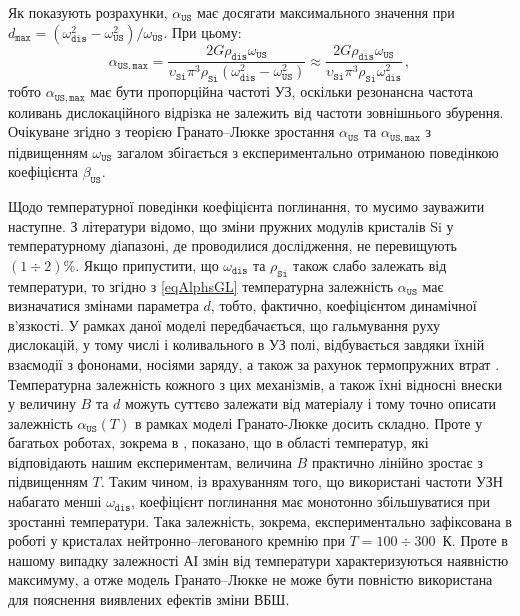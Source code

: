 Як показують розрахунки, $\alpha_\mathtt{US}$ має досягати максимального значення при
$d_\mathtt{max}=(\omega_\mathtt{dis}^2 - \omega_\mathtt{US}^2)/\omega_\mathtt{US}$.
При цьому:
\begin{equation}
\label{eqAlGLmax}
\alpha_\mathtt{US,max}=\frac{2G\rho_\mathtt{dis}\omega_\mathtt{US}}{\upsilon_\mathtt{Si}\pi^3\rho_\mathtt{Si}(\omega_\mathtt{dis}^2-\omega_\mathtt{US}^2)}
\approx\frac{2G\rho_\mathtt{dis}\omega_\mathtt{US}}{\upsilon_\mathtt{Si}\pi^3\rho_\mathtt{Si}\omega_\mathtt{dis}^2}\,,
\end{equation}
тобто $\alpha_\mathtt{US,max}$ має бути пропорційна частоті УЗ,
оскільки резонансна частота коливань дислокаційного відрізка не залежить від частоти зовнішнього збурення.
Очікуване згідно з теорією Гранато--Люкке зростання $\alpha_\mathtt{US}$ та $\alpha_\mathtt{US,max}$ з підвищенням $\omega_\mathtt{US}$ загалом
збігається з експериментально отриманою поведінкою коефіцієнта $\beta_\mathtt{US}$.

Щодо температурної поведінки коефіцієнта поглинання, то мусимо зауважити наступне.
З літератури \cite{Si_C:Temp} відомо, що зміни пружних модулів кристалів Si у температурному діапазоні, де проводилися дослідження, не перевищують $(1\div2)\%$.
Якщо припустити, що $\omega_\mathtt{dis}$ та $\rho_\mathtt{Si}$ також слабо залежать від температури, то згідно з \eqref{eqAlphsGL} температурна залежність $\alpha_\mathtt{US}$ має визначатися змінами параметра $d$, тобто, фактично, коефіцієнтом динамічної в'язкості.
У рамках даної моделі передбачається, що гальмування руху дислокацій, у тому числі і коливального в УЗ полі,
відбувається завдяки їхній взаємодії з фононами, носіями заряду, а також за рахунок термопружних втрат \cite{Granato,Sudz,True}.
Температурна залежність кожного з цих механізмів, а також їхні відносні внески у величину $B$ та $d$ можуть суттєво залежати від матеріалу і тому точно описати залежність $\alpha_\mathtt{US}(T)$ в рамках моделі Гранато-Люкке досить складно.
Проте у багатьох роботах, зокрема в \cite{True}, показано, що в області  температур,
які відповідають нашим експериментам, величина $B$ практично лінійно зростає з підвищенням $T$.
Таким чином, із врахуванням того, що використані частоти УЗН набагато менші $\omega_\mathtt{dis}$, коефіцієнт поглинання має монотонно збільшуватися при зростанні температури.
Така залежність, зокрема,  експериментально зафіксована в роботі \cite{YOlikh:USadsorb} у кристалах нейтронно--легованого кремнію при $T=100\div300$~К.
Проте в нашому випадку залежності АІ змін від температури характеризуються наявністю максимуму, а отже
модель Гранато--Люкке не може бути повністю використана для пояснення виявлених ефектів зміни ВБШ.


